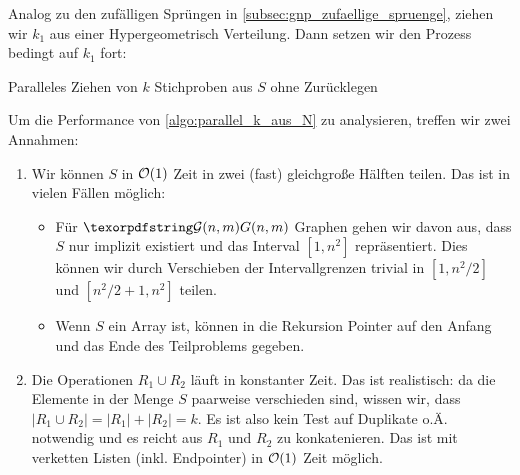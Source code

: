 Analog zu den zufälligen Sprüngen in \cref{subsec:gnp_zufaellige_spruenge}, ziehen wir $k_1$ aus einer Hypergeometrisch Verteilung.
Dann setzen wir den Prozess bedingt auf $k_1$ fort:

\begin{algorithm}
    \caption{Paralleles Ziehen von $k$ Stichproben aus $S$ ohne Zurücklegen}
    \label{algo:parallel_k_aus_N}
\end{algorithm}

\goodbreak

\noindent
Um die Performance von \cref{algo:parallel_k_aus_N} zu analysieren, treffen wir zwei Annahmen:
\begin{enumerate}
    \item Wir können $S$ in $\mathcal{O}\!\left(1\right)$ Zeit in zwei (fast) gleichgroße Hälften teilen.
          Das ist in vielen Fällen möglich:
          \begin{itemize}
              \item Für $\Gnm$ Graphen gehen wir davon aus, dass $S$ nur implizit existiert und das Interval $[1, n^2]$ repräsentiert.
                    Dies können wir durch Verschieben der Intervallgrenzen trivial in $[1, n^2 / 2]$ und $[n^2/2 + 1, n^2]$ teilen.
              \item Wenn $S$ ein Array ist, können in die Rekursion Pointer auf den Anfang und das Ende des Teilproblems gegeben.
          \end{itemize}

    \item Die Operationen $R_1 \cup R_2$ läuft in konstanter Zeit.
          Das ist realistisch: da die Elemente in der Menge $S$ paarweise verschieden sind, wissen wir, dass $|R_1 \cup R_2| = |R_1| + |R_2| = k$.
          Es ist also kein Test auf Duplikate o.Ä. notwendig und es reicht aus $R_1$ und $R_2$ zu konkatenieren.
          Das ist mit verketten Listen (inkl. Endpointer) in $\mathcal{O}\!\left(1\right)$ Zeit möglich.
\end{enumerate}

